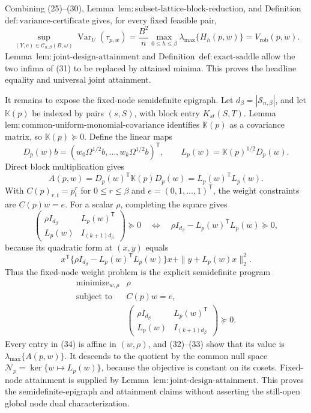 Combining (25)--(30), Lemma~\(\mathrm{lem{:}subset\text{-}lattice\text{-}block\text{-}reduction}\), and Definition~\(\mathrm{def{:}variance\text{-}certificate}\) gives, for every fixed feasible pair,
\[
\sup_{(Y,c)\in\mathcal C_{n,\beta}(B,\omega)}
\operatorname{Var}_U(\widehat\tau_{p,w})
=\frac{B^2}{n}\max_{0\le h\le\beta}
\lambda_{\max}\{H_h(p,w)\}
=V_{\mathrm{rob}}(p,w).
\tag{31}
\]
Lemma~\(\mathrm{lem{:}joint\text{-}design\text{-}attainment}\) and Definition~\(\mathrm{def{:}exact\text{-}saddle}\) allow the two infima of (31) to be replaced by attained minima.  This proves the headline equality and universal joint attainment.

It remains to expose the fixed-node semidefinite epigraph.  Let \(d_\beta=|\mathcal S_{n,\beta}|\), and let \(\mathbb K(p)\) be indexed by pairs \((s,S)\), with block entry \(K_{st}(S,T)\).  Lemma~\(\mathrm{lem{:}common\text{-}uniform\text{-}monomial\text{-}covariance}\) identifies \(\mathbb K(p)\) as a covariance matrix, so \(\mathbb K(p)\succeq0\).  Define the linear maps
\[
D_p(w)b=(w_0\Omega^{1/2}b,\ldots,w_k\Omega^{1/2}b)^{\mathsf T},
\qquad
L_p(w)=\mathbb K(p)^{1/2}D_p(w).
\]
Direct block multiplication gives
\[
A(p,w)=D_p(w)^{\mathsf T}\mathbb K(p)D_p(w)
=L_p(w)^{\mathsf T}L_p(w).
\tag{32}
\]
With \(C(p)_{r,t}=p_t^r\) for \(0\le r\le\beta\) and \(e=(0,1,\ldots,1)^{\mathsf T}\), the weight constraints are \(C(p)w=e\).  For a scalar \(\rho\), completing the square gives
\[
\begin{pmatrix}
\rho I_{d_\beta}&L_p(w)^{\mathsf T}\\
L_p(w)&I_{(k+1)d_\beta}
\end{pmatrix}\succeq0
\quad\Longleftrightarrow\quad
\rho I_{d_\beta}-L_p(w)^{\mathsf T}L_p(w)\succeq0,
\tag{33}
\]
because its quadratic form at \((x,y)\) equals
\[
x^{\mathsf T}\{\rho I_{d_\beta}-L_p(w)^{\mathsf T}L_p(w)\}x
+\|y+L_p(w)x\|_2^2.
\]
Thus the fixed-node weight problem is the explicit semidefinite program
\[
\begin{array}{ll}
\text{minimize}_{w,\rho}&\rho\\
\text{subject to}&C(p)w=e,\\
&\begin{pmatrix}
\rho I_{d_\beta}&L_p(w)^{\mathsf T}\\
L_p(w)&I_{(k+1)d_\beta}
\end{pmatrix}\succeq0.
\end{array}
\tag{34}
\]
Every entry in (34) is affine in \((w,\rho)\), and (32)--(33) show that its value is \(\lambda_{\max}\{A(p,w)\}\).  It descends to the quotient by the common null space \(\mathcal N_p=\ker\{w\mapsto L_p(w)\}\), because the objective is constant on its cosets.  Fixed-node attainment is supplied by Lemma~\(\mathrm{lem{:}joint\text{-}design\text{-}attainment}\).  This proves the semidefinite-epigraph and attainment claims without asserting the still-open global node dual characterization.